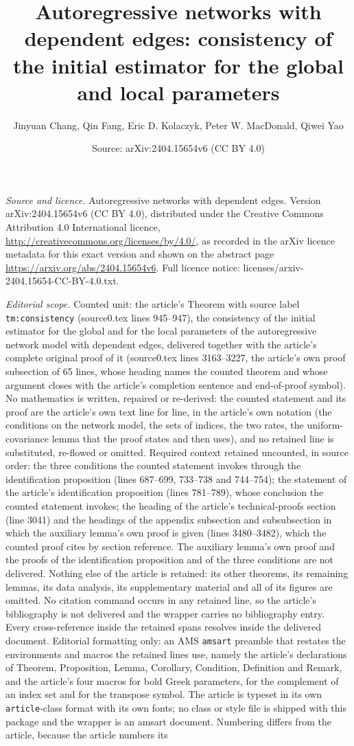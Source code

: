 \documentclass[10pt,a4paper]{amsart}
\title[Autoregressive networks with dependent edges]{Autoregressive networks with dependent edges: consistency of the initial estimator for the global and local parameters}
\author{Jinyuan Chang, Qin Fang, Eric D. Kolaczyk, Peter W. MacDonald, Qiwei Yao}
\date{Source: arXiv:2404.15654v6 (CC BY 4.0)}
\theoremstyle{plain}
\theoremstyle{remark}
\begin{document}
\maketitle
\noindent\emph{Source and licence.} Autoregressive networks with dependent edges. Version arXiv:2404.15654v6 (CC BY 4.0), distributed under the Creative Commons Attribution 4.0 International licence, \url{http://creativecommons.org/licenses/by/4.0/}, as recorded in the arXiv licence metadata for this exact version and shown on the abstract page \url{https://arxiv.org/abs/2404.15654v6}. Full licence notice: licenses/arxiv-2404.15654-CC-BY-4.0.txt.\par\smallskip

\noindent\textit{Editorial scope.} Counted unit: the article's Theorem with source label \texttt{tm:consistency} (source0.tex lines 945--947), the consistency of the initial estimator for the global and for the local parameters of the autoregressive network model with dependent edges, delivered together with the article's complete original proof of it (source0.tex lines 3163--3227, the article's own proof subsection of 65 lines, whose heading names the counted theorem and whose argument closes with the article's completion sentence and end-of-proof symbol). No mathematics is written, repaired or re-derived: the counted statement and its proof are the article's own text line for line, in the article's own notation (the conditions on the network model, the sets of indices, the two rates, the uniform-covariance lemma that the proof states and then uses), and no retained line is substituted, re-flowed or omitted. Required context retained uncounted, in source order: the three conditions the counted statement invokes through the identification proposition (lines 687--699, 733--738 and 744--754); the statement of the article's identification proposition (lines 781--789), whose conclusion the counted statement invokes; the heading of the article's technical-proofs section (line 3041) and the headings of the appendix subsection and subsubsection in which the auxiliary lemma's own proof is given (lines 3480--3482), which the counted proof cites by section reference. The auxiliary lemma's own proof and the proofs of the identification proposition and of the three conditions are not delivered. Nothing else of the article is retained: its other theorems, its remaining lemmas, its data analysis, its supplementary material and all of its figures are omitted. No citation command occurs in any retained line, so the article's bibliography is not delivered and the wrapper carries no bibliography entry. Every cross-reference inside the retained spans resolves inside the delivered document. Editorial formatting only: an AMS \texttt{amsart} preamble that restates the environments and macros the retained lines use, namely the article's declarations of Theorem, Proposition, Lemma, Corollary, Condition, Definition and Remark, and the article's four macros for bold Greek parameters, for the complement of an index set and for the transpose symbol. The article is typeset in its own \texttt{article}-class format with its own fonts; no class or style file is shipped with this package and the wrapper is an amsart document. Numbering differs from the article, because the article numbers its 
\end{document}
